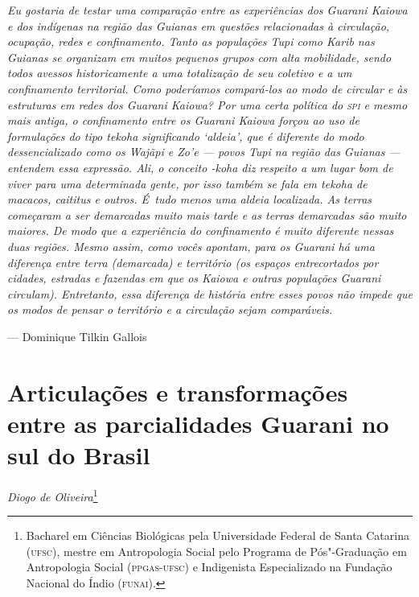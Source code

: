\begin{flushright}
\begin{minipage}[c]{0.85\textwidth}
\raggedleft
\footnotesize
\emph{Eu gostaria de testar uma comparação entre as experiências dos Guarani
Kaiowa e dos indígenas na região das Guianas em questões relacionadas à
circulação, ocupação, redes e confinamento. Tanto as populações Tupi
como Karib nas Guianas se organizam em muitos pequenos grupos com alta
mobilidade, sendo todos avessos historicamente a uma totalização de seu
coletivo e a um confinamento territorial. Como poderíamos compará-los
ao modo de circular e às estruturas em redes dos Guarani Kaiowa? Por
uma certa política do \textsc{spi} e mesmo mais antiga, o confinamento entre os
Guarani Kaiowa forçou ao uso de formulações do tipo \emph{tekoha} significando
‘aldeia’, que é diferente do modo dessencializado como os Wajãpi e Zo’e
--- povos Tupi na região das Guianas --- entendem essa expressão. Ali, o
conceito -\emph{koha} diz respeito a um lugar bom de viver para uma
determinada gente, por isso também se fala em \emph{tekoha} de macacos,
caititus e outros. É~tudo menos uma aldeia localizada. As terras
começaram a ser demarcadas muito mais tarde e as terras demarcadas são
muito maiores. De modo que a experiência do confinamento é muito
diferente nessas duas regiões. Mesmo assim, como vocês apontam, para os
Guarani há uma diferença entre terra (demarcada) e território (os
espaços entrecortados por cidades, estradas e fazendas em que os Kaiowa
e outras populações Guarani circulam). Entretanto, essa diferença de
história entre esses povos não impede que os modos de pensar o
território e a circulação sejam comparáveis.}

\smallskip
\hspace*{\fill}--- Dominique Tilkin Gallois
\end{minipage}
\end{flushright}

\thispagestyle{empty}

\chapter*{Articulações e transformações entre as parcialidades Guarani no sul do
Brasil}


\begin{flushright}
\emph{Diogo de Oliveira}\footnote{Bacharel em Ciências Biológicas pela Universidade Federal de Santa Catarina (\textsc{ufsc}),
mestre em Antropologia Social pelo Programa de Pós"-Graduação em Antropologia Social (\textsc{ppgas}-\textsc{ufsc}) e Indigenista
Especializado na Fundação Nacional do Índio (\textsc{funai}).}
\end{flushright}

